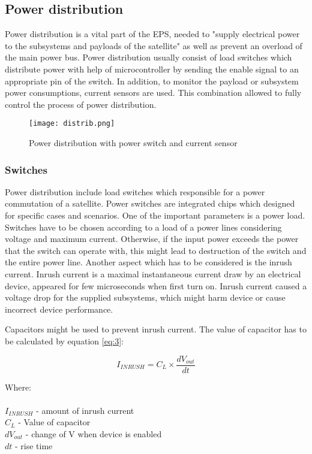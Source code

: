 \subsection{Power distribution \label{sec:tech}}

Power distribution is a vital part of the EPS, needed to \cite{21} "supply electrical power to the subsystems and payloads of the satellite" as well as prevent an overload of the main power bus. Power distribution usually consist of load switches which distribute power with help of microcontroller by sending the enable signal to an appropriate pin of the switch. In addition, to monitor the payload or subsystem power consumptions, current sensors are used. This combination allowed to fully control the process of power distribution.


\begin{figure}[h]
	\centering
	\texttt{[image: distrib.png]}
	\caption{Power distribution with power switch and current sensor}
	\label{fig: EPS}
\end{figure}

\newpage

\subsubsection{Switches}
Power distribution include load switches which responsible for a power commutation of a satellite. Power switches are integrated chips which designed for specific cases and scenarios. One of the important parameters is a power load. Switches have to be chosen according to a load of a power lines considering voltage and maximum current. Otherwise, if the input power exceeds the power that the switch can operate with, this might lead to destruction of the switch and the entire power line.  Another aspect which has to be considered is the inrush current. Inrush current is a maximal instantaneous current draw by an electrical device, appeared for few microseconds when first turn on. Inrush current caused a voltage drop for the supplied subsystems, which might harm device or cause incorrect device performance.

 Capacitors might be used to prevent inrush current. The value of capacitor has to be calculated by equation \ref{eq:3}:
 
 \begin{equation}\label{eq:3}
 I_{INRUSH} = C_{L} \times \dfrac{dV_{out}}{dt}
 \end{equation}
 
 Where:\\ \\
 $I_{INRUSH}$ - amount of inrush current\\
 $C_{L}$ - Value of capacitor \\
 $dV_{out}$ - change of V when device is enabled\\
 $dt$ - rise time\\

